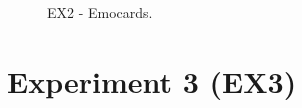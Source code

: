\begin{apendicesenv}
\newpage

\begin{figure}
    \centering
    
    \caption{EX2 - Emocards.}
    \label{fig:ex2Emocards}
\end{figure}



\chapter{Experiment 3 (EX3)}



\end{apendicesenv}
